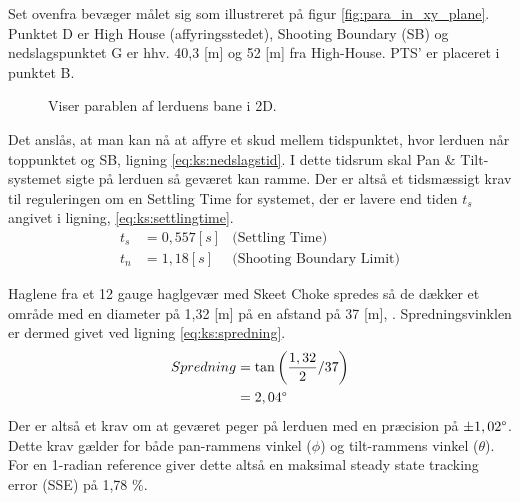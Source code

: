 Set ovenfra bevæger målet sig som illustreret på figur \ref{fig:para_in_xy_plane}. Punktet D er High House (affyringsstedet), Shooting Boundary (SB) og nedslagspunktet G er hhv. 40,3 [m] og 52 [m] fra High-House. PTS' er placeret i punktet B.\\
\begin{figure}[h!]
\centering
{}
\caption[Lerduens parabel i 2D]{Viser parablen af lerduens bane i 2D.}
\end{figure}
Det anslås, at man kan nå at affyre et skud mellem tidspunktet,
hvor lerduen når toppunktet og SB, ligning \ref{eq:ks:nedslagstid}.
I dette tidsrum skal Pan \& Tilt-systemet sigte på lerduen så geværet kan ramme.
Der er altså et tidsmæssigt krav til reguleringen om en Settling Time for systemet,
der er lavere end tiden \(t_{s}\) angivet i ligning, \ref{eq:ks:settlingtime}.
\begin{align}
  t_{s} &= 0,557 [s] &\text{(Settling Time)}
  \label{eq:ks:settlingtime}
\\
  t_{n} &= 1,18 [s] &\text{(Shooting Boundary Limit)}
  \label{eq:ks:nedslagstid}
\end{align}

Haglene fra et 12 gauge haglgevær med Skeet Choke spredes så de dækker et område
med en diameter på 1,32 [m] på en afstand på 37 [m], \citep[Pattern and choke]{patternandchoke}.
Spredningsvinklen er dermed givet ved ligning \ref{eq:ks:spredning}.
\begin{align}
  Spredning &= \tan \left(\frac{1,32}{2} / 37 \right) \\
  &= 2,04 \degree
  \label{eq:ks:spredning}
\end{align}
Der er altså et krav om at geværet peger på lerduen med en præcision på \(\pm 1,02 \degree\).
Dette krav gælder for både pan-rammens vinkel (\(\phi\)) og tilt-rammens vinkel (\(\theta\)).
For en 1-radian reference giver dette altså en maksimal steady state tracking error (SSE) på 1,78 \%.

